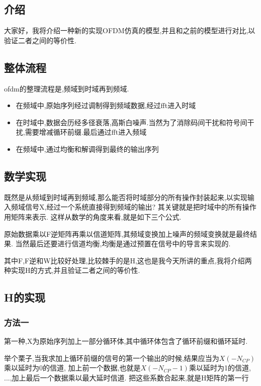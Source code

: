 
\subsection{介绍}
\indent 大家好，我将介绍一种新的实现OFDM仿真的模型,并且和之前的模型进行对比,以验证二者之间的等价性.

\subsection{整体流程}
\indent ofdm的整理流程是,频域到时域再到频域.
\begin{itemize}
  \item 在频域中,原始序列经过调制得到频域数据,经过fft进入时域
  \item 在时域中,数据会历经多径衰落,高斯白噪声.当然为了消除码间干扰和符号间干扰,需要增减循环前缀.最后通过fft进入频域
  \item	在频域中,通过均衡和解调得到最终的输出序列
\end{itemize}

\subsection{数学实现}
\indent 既然是从频域到时域再到频域,那么能否将时域部分的所有操作封装起来,以实现输入频域信号X,经过一个系统直接得到频域的输出?
其关键就是把时域中的所有操作用矩阵来表示.
这样从数学的角度来看,就是如下三个公式.

原始数据乘以F逆矩阵再乘以信道矩阵,其频域变换加上噪声的频域变换就是最终结果.
当然最后还要进行信道均衡,均衡是通过预置在信号中的导言来实现的.

其中F,F逆和W比较好处理,比较棘手的是H,这也是我今天所讲的重点,我将介绍两种实现H的方式,并且验证二者之间的等价性.

\subsection{H的实现}
\subsubsection{方法一}
\indent 第一种,X为原始序列加上一部分循环体,其中循环体包含了循环前缀和循环延时.

举个栗子,当我求加上循环前缀的信号的第一个输出的时候,结果应当为$X(-N_{CP})$乘以延时为0的信道, 加上前一个数据,也就是$X(-N_{CP}-1)$乘以延时为1的信道, ...,加上最后一个数据乘以最大延时信道.
把这些系数合起来,就是H矩阵的第一行

